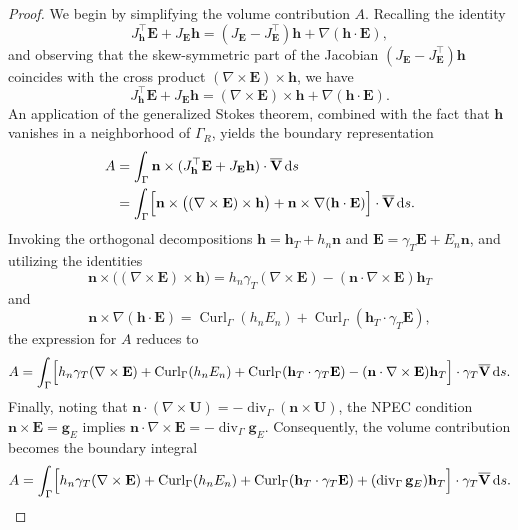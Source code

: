 \documentclass[12pt,reqno]{amsart}
\theoremstyle{definition}
\numberwithin{equation}{section}
\begin{document}
\begin{proof}
We begin by simplifying the volume contribution $A$. Recalling the identity
\[
J_{\mathbf{h}}^{\top}\mathbf{E} + J_{\mathbf{E}}\mathbf{h} = (J_{\mathbf{E}} - J_{\mathbf{E}}^{\top})\mathbf{h} + \nabla(\mathbf{h} \cdot \mathbf{E}),
\]
and observing that the skew-symmetric part of the Jacobian $(J_{\mathbf{E}} - J_{\mathbf{E}}^{\top})\mathbf{h}$ coincides with the cross product $(\nabla \times \mathbf{E}) \times \mathbf{h}$, we have
\[
J_{\mathbf{h}}^{\top}\mathbf{E} + J_{\mathbf{E}}\mathbf{h} = (\nabla \times \mathbf{E}) \times \mathbf{h} + \nabla(\mathbf{h} \cdot \mathbf{E}).
\]
An application of the generalized Stokes theorem, combined with the fact that $\mathbf{h}$ vanishes in a neighborhood of $\Gamma_R$, yields the boundary representation
\begin{equation*}
\begin{aligned}
A &= \int_\Gamma \mathbf{n} \times (J_{\mathbf{h}}^{\top}\mathbf{E} + J_{\mathbf{E}}\mathbf{h}) \cdot \overline{\mathbf{V}} \, \mathrm{d}s \\
&= \int_\Gamma \Bigl[ \mathbf{n} \times \bigl( (\nabla \times \mathbf{E}) \times \mathbf{h} \bigr) + \mathbf{n} \times \nabla(\mathbf{h} \cdot \mathbf{E}) \Bigr] \cdot \overline{\mathbf{V}} \, \mathrm{d}s.
\end{aligned}
\end{equation*}
Invoking the orthogonal decompositions $\mathbf{h} = \mathbf{h}_T + h_n \mathbf{n}$ and $\mathbf{E} = \gamma_T \mathbf{E} + E_n \mathbf{n}$, and utilizing the identities
\[
\mathbf{n} \times \bigl( (\nabla \times \mathbf{E}) \times \mathbf{h} \bigr) = h_n \gamma_T(\nabla \times \mathbf{E}) - (\mathbf{n} \cdot \nabla \times \mathbf{E}) \mathbf{h}_T
\]
and
\[
\mathbf{n} \times \nabla(\mathbf{h} \cdot \mathbf{E}) = \operatorname{Curl}_\Gamma(h_n E_n) + \operatorname{Curl}_\Gamma(\mathbf{h}_T \cdot \gamma_T \mathbf{E}),
\]
the expression for $A$ reduces to
\begin{equation*}
A = \int_\Gamma \Bigl[ h_n \gamma_T(\nabla \times \mathbf{E}) + \operatorname{Curl}_\Gamma(h_n E_n) + \operatorname{Curl}_\Gamma(\mathbf{h}_T \cdot \gamma_T \mathbf{E}) - (\mathbf{n} \cdot \nabla \times \mathbf{E}) \mathbf{h}_T \Bigr] \cdot \gamma_T\overline{\mathbf{V}} \, \mathrm{d}s.
\end{equation*}
Finally, noting that $\mathbf{n} \cdot (\nabla \times \mathbf{U}) = -\operatorname{div}_\Gamma(\mathbf{n} \times \mathbf{U})$, the NPEC condition $\mathbf{n} \times \mathbf{E} = \mathbf{g}_E$ implies $\mathbf{n} \cdot \nabla \times \mathbf{E} = -\operatorname{div}_\Gamma \mathbf{g}_E$. Consequently, the volume contribution becomes the boundary integral
\begin{equation*}
A = \int_\Gamma \Bigl[ h_n \gamma_T(\nabla \times \mathbf{E}) + \operatorname{Curl}_\Gamma(h_n E_n) + \operatorname{Curl}_\Gamma(\mathbf{h}_T \cdot \gamma_T \mathbf{E}) + (\operatorname{div}_\Gamma \mathbf{g}_E) \mathbf{h}_T \Bigr] \cdot \gamma_T\overline{\mathbf{V}} \, \mathrm{d}s.
\end{equation*}




\end{proof}
\end{document}
